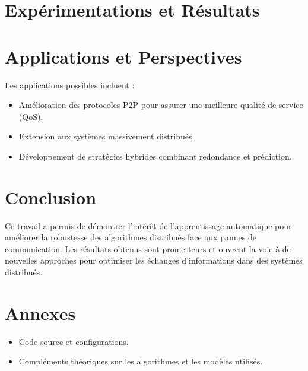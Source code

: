 \documentclass[a4paper,12pt]{article}
\begin{document}
\section{Expérimentations et Résultats}


\section{Applications et Perspectives}
Les applications possibles incluent :
\begin{itemize}
    \item Amélioration des protocoles P2P pour assurer une meilleure qualité de service (QoS).
    \item Extension aux systèmes massivement distribués.
    \item Développement de stratégies hybrides combinant redondance et prédiction.
\end{itemize}

\section{Conclusion}
Ce travail a permis de démontrer l’intérêt de l’apprentissage automatique pour améliorer la robustesse des algorithmes distribués face aux pannes de communication. Les résultats obtenus sont prometteurs et ouvrent la voie à de nouvelles approches pour optimiser les échanges d’informations dans des systèmes distribués.

\section{Annexes}
\begin{itemize}
    \item Code source et configurations.
    \item Compléments théoriques sur les algorithmes et les modèles utilisés.
\end{itemize}
\end{document}
